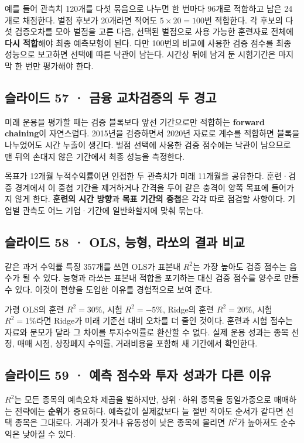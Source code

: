 \documentclass[11pt,a4paper]{article}
\begin{document}
예를 들어 관측치 120개를 다섯 묶음으로 나누면 한 번마다 96개로 적합하고 남은 24개로 채점한다. 벌점 후보가 20개라면 적어도 $5\times20=100$번 적합한다. 각 후보의 다섯 검증오차를 모아 벌점을 고른 다음, 선택된 벌점으로 사용 가능한 훈련자료 전체에 \textbf{다시 적합}해야 최종 예측모형이 된다. 다만 100번의 비교에 사용한 검증 점수를 최종 성능으로 보고하면 선택에 따른 낙관이 남는다. 시간상 뒤에 남겨 둔 시험기간은 마지막 한 번만 평가해야 한다.\par

\subsection{슬라이드 57 · 금융 교차검증의 두 경고}
미래 운용을 평가할 때는 검증 블록보다 앞선 기간으로만 적합하는 \textbf{forward chaining}이 자연스럽다. 2015년을 검증하면서 2020년 자료로 계수를 적합하면 블록을 나누었어도 시간 누출이 생긴다. 벌점 선택에 사용한 검증 점수에는 낙관이 남으므로 맨 뒤의 손대지 않은 기간에서 최종 성능을 측정한다.\par

목표가 12개월 누적수익률이면 인접한 두 관측치가 미래 11개월을 공유한다. 훈련·검증 경계에서 이 중첩 기간을 제거하거나 간격을 두어 같은 충격이 양쪽 목표에 들어가지 않게 한다. \textbf{훈련의 시간 방향}과 \textbf{목표 기간의 중첩}은 각각 따로 점검할 사항이다. 기업별 관측도 어느 기업·기간에 일반화할지에 맞춰 묶는다.\par

\subsection{슬라이드 58 · OLS, 능형, 라쏘의 결과 비교}
같은 과거 수익률 특징 357개를 쓰면 OLS가 표본내 $R^2$는 가장 높아도 검증 점수는 음수가 될 수 있다. 능형과 라쏘는 표본내 적합을 포기하는 대신 검증 점수를 양수로 만들 수 있다. 이것이 편향을 도입한 이유를 경험적으로 보여 준다.\par

가령 OLS의 훈련 $R^2=30\%$, 시험 $R^2=-5\%$, Ridge의 훈련 $R^2=20\%$, 시험 $R^2=1\%$라면 Ridge가 미래 기준선 대비 오차를 더 줄인 것이다. 훈련과 시험 점수는 자료와 분모가 달라 그 차이를 투자수익률로 환산할 수 없다. 실제 운용 성과는 종목 선정, 매매 시점, 상장폐지 수익률, 거래비용을 포함해 새 기간에서 확인한다.\par

\subsection{슬라이드 59 · 예측 점수와 투자 성과가 다른 이유}
$R^2$는 모든 종목의 예측오차 제곱을 벌하지만, 상위·하위 종목을 동일가중으로 매매하는 전략에는 \textbf{순위}가 중요하다. 예측값이 실제값보다 늘 절반 작아도 순서가 같다면 선택 종목은 그대로다. 거래가 잦거나 유동성이 낮은 종목에 몰리면 $R^2$가 높아져도 순수익은 낮아질 수 있다.\par
\end{document}
